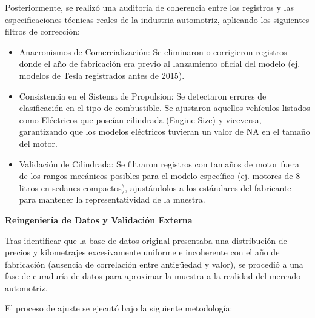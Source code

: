 \documentclass[oneside,11pt]{Latex/Classes/PhDthesisPSnPDF}
\begin{document}
Posteriormente, se realizó una auditoría de coherencia entre los
registros y las especificaciones técnicas reales de la industria
automotriz, aplicando los siguientes filtros de corrección:

\begin{itemize}

 \item Anacronismos de Comercialización: Se eliminaron o corrigieron registros donde el año de fabricación era previo al lanzamiento oficial del modelo (ej. modelos de Tesla registrados antes de 2015).

 \item Consistencia en el Sistema de Propulsion: Se detectaron errores de clasificación en el tipo de combustible. Se ajustaron aquellos vehículos listados como Eléctricos que poseían cilindrada (Engine Size) y viceversa, garantizando que los modelos eléctricos tuvieran un valor de NA en el tamaño del motor.

 \item Validación de Cilindrada: Se filtraron registros con tamaños de motor fuera de los rangos mecánicos posibles para el modelo específico (ej. motores de 8 litros en sedanes compactos), ajustándolos a los estándares del fabricante para mantener la representatividad de la muestra.
 \end{itemize}

\textbf{Reingeniería de Datos y Validación Externa}

Tras identificar que la base de datos original presentaba una
distribución de precios y kilometrajes excesivamente uniforme e
incoherente con el año de fabricación (ausencia de correlación entre
antigüedad y valor), se procedió a una fase de curaduría de datos para
aproximar la muestra a la realidad del mercado automotriz.

El proceso de ajuste se ejecutó bajo la siguiente metodología:
\end{document}
